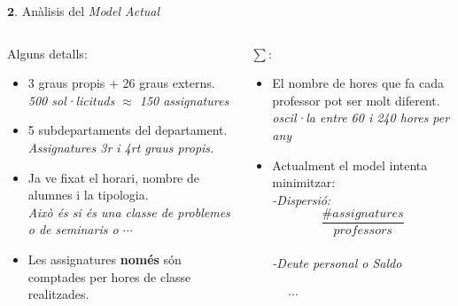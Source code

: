 \documentclass[twocolumn]{beamer}
\begin{document}
\begin{frame}{$\mathbf 2.$ Anàlisis del \textit{Model Actual}}
\begin{columns}[t]
	\begin{column}{.5\textwidth}
		\begin{block}{Alguns detalls:}
			\begin{itemize}
				\footnotesize
				\item 3 graus propis + 26 graus externs. \\ \textit{\footnotesize \color{blue} 500 sol·licituds $\approx$ 150 assignatures}
				\item 5 subdepartaments del departament. \\ \textit{ \footnotesize \color{blue} Assignatures 3r i 4rt graus propis.}
				\item  Ja ve fixat el horari, nombre de alumnes i la tipologia. \\ \textit{\footnotesize \color{blue} Això és si és una classe de problemes o de seminaris o $\cdots$}
				\item Les assignatures \textbf{només} són comptades per hores de classe realitzades.
			\end{itemize}
		\end{block}
	\end{column}
	\begin{column}{.5\textwidth}
		
		\begin{block}{\Large$\sum:   $}
			\begin{itemize}
			\footnotesize
			\item El nombre de hores que fa cada professor pot ser molt diferent. \\ \textit{\footnotesize \color{blue} oscil·la entre 60 i 240 hores per any}
			\item Actualment el model intenta minimitzar:
			\textit{\footnotesize \color{blue}
				\\-Dispersió:$$\frac{\# assignatures}{professors}$$
				\\-Deute personal o Saldo}
		     \end{itemize}
		\end{block}
	
		\Huge$\quad  \quad  \quad \cdots$ 
		
	    \end{column}
\end{columns}
\end{frame}
\end{document}
